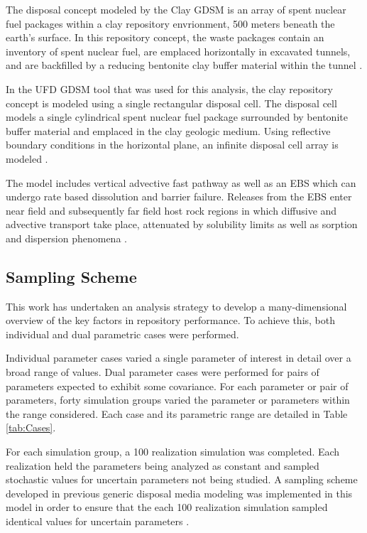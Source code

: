 The disposal concept modeled by the Clay \gls{GDSM} is an array of spent nuclear 
fuel packages within a clay repository envrionment, 500 meters beneath the 
earth's surface. In this repository concept, the waste packages contain an 
inventory of spent nuclear fuel, are emplaced horizontally in excavated tunnels, 
and are backfilled by a reducing bentonite clay buffer material within the 
tunnel \cite{nutt_generic_2009}. 

In the \gls{UFD} \gls{GDSM} tool that was used for this analysis, the clay 
repository concept is modeled using a single rectangular disposal cell. The 
disposal cell models a single cylindrical spent nuclear fuel package surrounded 
by bentonite buffer material and emplaced in the clay geologic medium. Using 
reflective boundary conditions in the horizontal plane, an infinite disposal 
cell array is modeled \cite{nutt_generic_2009}.

The model includes vertical advective fast pathway as well as an \gls{EBS} which 
can undergo rate based dissolution and barrier failure.  Releases from the 
\gls{EBS} enter near field and subsequently far field host rock regions in which 
diffusive and advective transport take place, attenuated by solubility limits as 
well as sorption and dispersion phenomena \cite{clayton_generic_2011}.

\subsection{Sampling Scheme}

This work has undertaken an analysis strategy to develop a many-dimensional 
overview of the key factors in repository performance. To achieve this, 
both individual and dual parametric cases were performed.

Individual parameter cases varied a single parameter of interest in 
detail over a broad range of values. Dual parameter cases were 
performed for pairs of parameters expected to exhibit some covariance. For 
each parameter or pair of parameters, forty simulation 
groups varied the parameter or parameters within the range considered. Each 
case and its parametric range are detailed in Table \ref{tab:Cases}. 



For each simulation group, a 100 realization simulation was completed. Each
realization held the parameters being analyzed as constant and sampled 
stochastic values for uncertain parameters not being studied.  A sampling scheme 
developed in previous generic disposal media modeling was implemented in this 
model in order to ensure that the each 100 realization simulation sampled 
identical values for uncertain parameters \cite{clayton_generic_2011, 
nutt_generic_2009}.  



